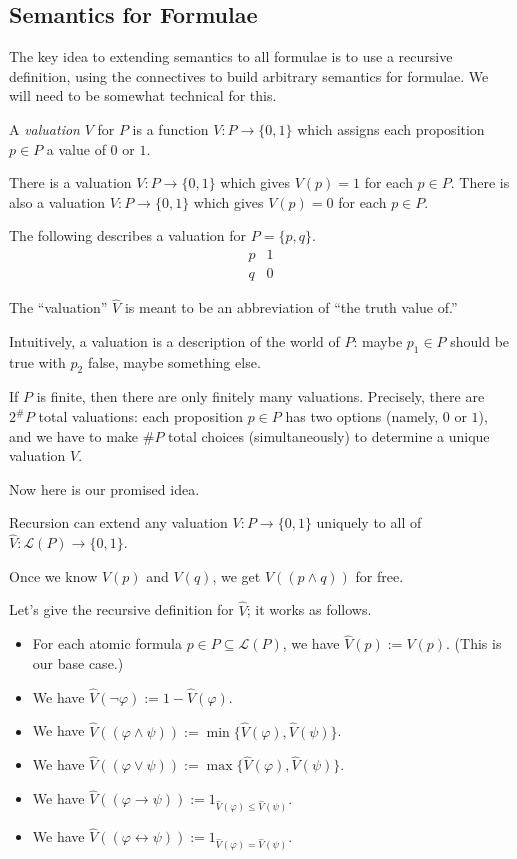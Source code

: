 \documentclass[../notes.tex]{subfiles}
\begin{document}
\subsection{Semantics for Formulae}
The key idea to extending semantics to all formulae is to use a recursive definition, using the connectives to build arbitrary semantics for formulae. We will need to be somewhat technical for this.
\begin{definition}[Valuation]
	A \textit{valuation} $V$ for $P$ is a function $V:P\to\{0,1\}$ which assigns each proposition $p\in P$ a value of $0$ or $1$.
\end{definition}
\begin{example}
	There is a valuation $V:P\to\{0,1\}$ which gives $V(p)=1$ for each $p\in P$. There is also a valuation $V:P\to\{0,1\}$ which gives $V(p)=0$ for each $p\in P$.
\end{example}
\begin{example}
	The following describes a valuation for $P=\{p,q\}$.
	\[\begin{array}{c|c}
		p & 1 \\
		q & 0
	\end{array}\]
\end{example}
\begin{remark}
	The ``valuation'' $\hat V$ is meant to be an abbreviation of ``the truth value of.''
\end{remark}
Intuitively, a valuation is a description of the world of $P$: maybe $p_1\in P$ should be true with $p_2$ false, maybe something else.
\begin{remark}
	If $P$ is finite, then there are only finitely many valuations. Precisely, there are $2^\#P$ total valuations: each proposition $p\in P$ has two options (namely, $0$ or $1$), and we have to make $\#P$ total choices (simultaneously) to determine a unique valuation $V$.
\end{remark}
Now here is our promised idea.
\begin{idea}
	Recursion can extend any valuation $V:P\to\{0,1\}$ uniquely to all of $\hat V:\mathcal L(P)\to\{0,1\}$.
\end{idea}
\begin{example}
	Once we know $V(p)$ and $V(q)$, we get $V((p\land q))$ for free.
\end{example}
Let's give the recursive definition for $\hat V$; it works as follows.
\begin{itemize}
	\item For each atomic formula $p\in P\subseteq\mathcal L(P)$, we have $\hat V(p):=V(p)$. (This is our base case.)
	\item We have $\hat V(\lnot\varphi):=1-\hat V(\varphi)$.
	\item We have $\hat V((\varphi\land\psi)):=\min\{\hat V(\varphi),\hat V(\psi)\}$.
	\item We have $\hat V((\varphi\lor\psi)):=\max\{\hat V(\varphi),\hat V(\psi)\}$.
	\item We have $\hat V((\varphi\to\psi)):=1_{\hat V(\varphi)\le\hat V(\psi)}$.
	\item We have $\hat V((\varphi\leftrightarrow\psi)):=1_{\hat V(\varphi)=\hat V(\psi)}$.
\end{itemize}
\end{document}
